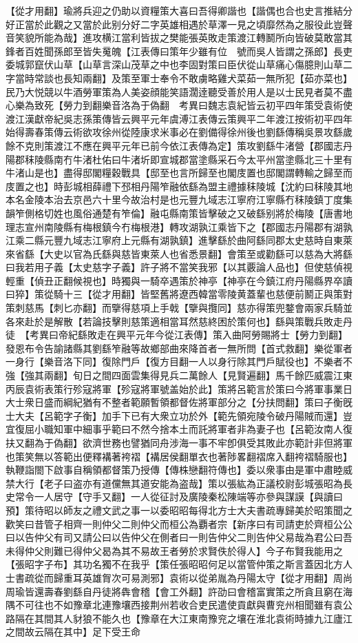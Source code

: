 【從才用翻】瑜將兵迎之仍助以資糧策大喜曰吾得卿諧也【諧偶也合也史言推結分好正當於此觀之又當於此别分好二字英雄相遇於草澤一見之頃靡然為之服役此豈聲音笑貌所能為哉】進攻横江當利皆拔之樊能張英敗走策渡江轉鬭所向皆破莫敢當其鋒者百姓聞孫郎至皆失䰟魄【江表傳曰策年少雖有位　號而吳人皆謂之孫郎】長吏委城郭竄伏山草【山草言深山茂草之中也李固對策曰臣伏從山草痛心傷臆則山草二字當時常談也長知兩翻】及策至軍士奉令不敢虜略雞犬菜茹一無所犯【茹亦菜也】民乃大悦競以牛酒勞軍策為人美姿顔能笑語濶逹聽受善於用人是以士民見者莫不盡心樂為致死【勞力到翻樂音洛為于偽翻　考異曰魏志袁紀皆云初平四年策受袁術使渡江漢獻帝紀吳志孫策傳皆云興平元年虞溥江表傳云策興平二年渡江按術初平四年始得壽春策傳云術欲攻徐州從陸康求米事必在劉備得徐州後也劉繇傳稱吳景攻繇歲餘不克則策渡江不應在興平元年已前今依江表傳為定】策攻劉繇牛渚營【郡國志丹陽郡秣陵縣南冇牛渚杜佑曰牛渚圻即宣城郡當塗縣采石今太平州當塗縣北三十里有牛渚山是也】盡得邸閣糧穀戰具【邸至也言所歸至也閣庋置也邸閣謂轉輸之歸至而庋置之也】時彭城相薛禮下邳相丹陽笮融依繇為盟主禮據秣陵城【沈約曰秣陵其地本名金陵本治去京邑六十里今故治村是也元豐九域志江寧府江寧縣冇秣陵鎮丁度集韻笮側格切姓也風俗通楚有笮倫】融屯縣南策皆擊破之又破繇别將於梅陵【唐書地理志宣州南陵縣有梅根鎮今冇梅根港】轉攻湖孰江乘皆下之【郡國志丹陽郡有湖孰江乘二縣元豐九域志江寧府上元縣有湖孰鎮】進擊繇於曲阿繇同郡太史慈時自東萊來省繇【大史以官為氏繇與慈皆東萊人也省悉景翻】會策至或勸繇可以慈為大將繇曰我若用子義【太史慈字子義】許子將不當笑我邪【以其覈論人品也】但使慈偵視輕重【偵丑正翻候視也】時獨與一騎卒遇策於神亭【神亭在今鎮江府丹陽縣界卒讀曰猝】策從騎十三【從才用翻】皆堅舊將遼西韓當零陵黄蓋輩也慈便前鬭正與策對策刺慈馬【刺匕亦翻】而擥得慈項上手戟【擥與攬同】慈亦得策兜鍪會兩家兵騎並各來赴於是解散【若論技擊則慈策適相當耳然慈終困於策何也】繇與策戰兵敗走丹徒　【考異曰帝紀繇敗走在興平元年今從江表傳】策入曲阿勞賜將士【勞力到翻】發恩布令告諭諸縣其劉繇笮融等故鄉部曲來降首者一無所問【首式救翻】樂從軍者一身行【樂音洛下同】復除門戶【復方目翻一人以身行除其門戶賦役也】不樂者不強【強其兩翻】旬日之間四面雲集得見兵二萬餘人【見賢遍翻】馬千餘匹威震江東丙辰袁術表策行殄寇將軍【殄寇將軍號盖始於此】策將呂範言於策曰今將軍事業日大士衆日盛而綱紀猶有不整者範願暫領都督佐將軍部分之【分扶問翻】策曰子衡旣士大夫【呂範字子衡】加手下已有大衆立功於外【範先領宛陵令破丹陽賊而還】豈宜復屈小職知軍中細事乎範曰不然今捨本土而託將軍者非為妻子也【呂範汝南人復扶又翻為于偽翻】欲濟世務也譬猶同舟涉海一事不牢卽俱受其敗此亦範計非但將軍也策笑無以答範出便釋褠著袴褶【褠居侯翻單衣也著陟畧翻褶席入翻袴褶騎服也】執鞭詣閤下啟事自稱領都督策乃授傳【傳株戀翻符傳也】委以衆事由是軍中肅睦威禁大行【老子曰盗亦有道儻無其道安能為盗哉】策以張紘為正議校尉彭城張昭為長史常令一人居守【守手又翻】一人從征討及廣陵秦松陳端等亦參與謀謨【與讀曰預】策待昭以師友之禮文武之事一以委昭昭每得北方士大夫書疏專歸美於昭策聞之歡笑曰昔管子相齊一則仲父二則仲父而桓公為覇者宗【新序曰有司請吏於齊桓公公曰以告仲父有司又請公曰以告仲父在側者曰一則告仲父二則告仲父易哉為君公曰吾未得仲父則難已得仲父曷為其不易故王者勞於求賢佚於得人】今子布賢我能用之【張昭字子布】其功名獨不在我乎【策任張昭昭何足以當管仲策之斯言蓋因北方人士書疏從而歸重耳英雄胷次可易測邪】袁術以從弟胤為丹陽太守【從才用翻】周尚周瑜皆還壽春劉繇自丹徒將犇會稽【會工外翻】許劭曰會稽富實策之所貪且窮在海隅不可往也不如豫章北連豫壤西接荆州若收合吏民遣使貢獻與曹兖州相聞雖有袁公路隔在其間其人豺狼不能久也【豫章在大江東南豫兖之壤在淮北袁術時據九江廬江之間故云隔在其中】足下受王命